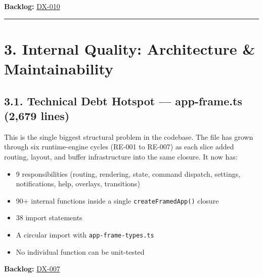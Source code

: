 \textbf{Backlog:} \href{https://github.com/flyingrobots/bijou/blob/cbd70612140e7a450d764b3c7be1c6af878b99bc/docs/method/graveyard/legacy-backlog/cool-ideas/DX-010-typed-subapp-adapter.md}{DX-010}

\begin{center}\rule{0.5\linewidth}{0.5pt}\end{center}

\section{3. Internal Quality: Architecture \& Maintainability}\label{record-411-internal-quality-architecture-maintainability}

\subsection{3.1. Technical Debt Hotspot --- app-frame.ts (2,679 lines)}\label{record-411-technical-debt-hotspot-app-frame.ts-2679-lines}

This is the single biggest structural problem in the codebase. The file has grown through six runtime-engine cycles (RE-001 to RE-007) as each slice added routing, layout, and buffer infrastructure into the same closure. It now has:

\begin{itemize}
\tightlist
\item
  9 responsibilities (routing, rendering, state, command dispatch, settings, notifications, help, overlays, transitions)
\item
  90+ internal functions inside a single \texttt{c\allowbreak{}r\allowbreak{}e\allowbreak{}a\allowbreak{}t\allowbreak{}e\allowbreak{}F\allowbreak{}r\allowbreak{}a\allowbreak{}m\allowbreak{}e\allowbreak{}d\allowbreak{}A\allowbreak{}p\allowbreak{}p\allowbreak{}(\allowbreak{})} closure
\item
  38 import statements
\item
  A circular import with \texttt{a\allowbreak{}p\allowbreak{}p\allowbreak{}-\allowbreak{}f\allowbreak{}r\allowbreak{}a\allowbreak{}m\allowbreak{}e\allowbreak{}-\allowbreak{}t\allowbreak{}y\allowbreak{}p\allowbreak{}e\allowbreak{}s\allowbreak{}.\allowbreak{}t\allowbreak{}s}
\item
  No individual function can be unit-tested
\end{itemize}

\textbf{Backlog:} \href{https://github.com/flyingrobots/bijou/blob/cbd70612140e7a450d764b3c7be1c6af878b99bc/docs/method/graveyard/legacy-backlog/bad-code/DX-007-decompose-app-frame-mega-closure.md}{DX-007}

